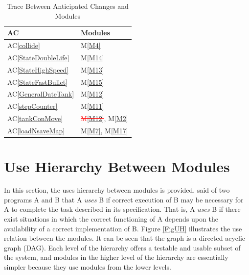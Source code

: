 \documentclass[12pt, titlepage]{article}
\newcommand{\acref}[1]{AC\ref{#1}}
\newcommand{\mref}[1]{M\ref{#1}}
\begin{document}
\begin{table}[H]
\centering
\begin{tabular}{p{} p{}}
\toprule
\textbf{AC} & \textbf{Modules}\\
\midrule
\acref{collide} & \mref{M4}\\
\acref{StateDoubleLife} & \mref{M14}\\
\acref{StateHighSpeed} & \mref{M13}\\
\acref{StateFastBullet} & \mref{M15}\\
\acref{GeneralDateTank} & \mref{M12}\\
\acref{stepCounter} & \mref{M11}\\
\acref{tankConMove} & \textcolor{red}{\sout{\mref{M12}}}, \mref{M2}\\
\acref{loadNsaveMap} & \mref{M7}, \mref{M17}\\

\bottomrule
\end{tabular}
\caption{Trace Between Anticipated Changes and Modules}
\label{TblACT}
\end{table}


\section{Use Hierarchy Between Modules} \label{SecUse}

In this section, the uses hierarchy between modules is
provided. \citet{Parnas1978} said of two programs A and B that A {\em uses} B if
correct execution of B may be necessary for A to complete the task described in
its specification. That is, A {\em uses} B if there exist situations in which
the correct functioning of A depends upon the availability of a correct
implementation of B.  Figure \ref{FigUH} illustrates the use relation between
the modules. It can be seen that the graph is a directed acyclic graph
(DAG). Each level of the hierarchy offers a testable and usable subset of the
system, and modules in the higher level of the hierarchy are essentially simpler
because they use modules from the lower levels.
\end{document}
